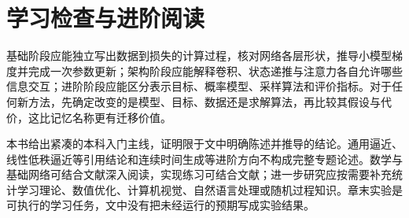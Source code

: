 \chapter*{学习检查与进阶阅读}
基础阶段应能独立写出数据到损失的计算过程，核对网络各层形状，推导小模型梯度并完成一次参数更新；架构阶段应能解释卷积、状态递推与注意力各自允许哪些信息交互；进阶阶段应能区分表示目标、概率模型、采样算法和评价指标。对于任何新方法，先确定改变的是模型、目标、数据还是求解算法，再比较其假设与代价，这比记忆名称更有迁移价值。

本书给出紧凑的本科入门主线，证明限于文中明确陈述并推导的结论。通用逼近、线性低秩逼近等引用结论和连续时间生成等进阶方向不构成完整专题论述。数学与基础网络可结合文献\cite{goodfellow2016}深入阅读，实现练习可结合文献\cite{d2l}；进一步研究应按需要补充统计学习理论、数值优化、计算机视觉、自然语言处理或随机过程知识。章末实验是可执行的学习任务，文中没有把未经运行的预期写成实验结果。

